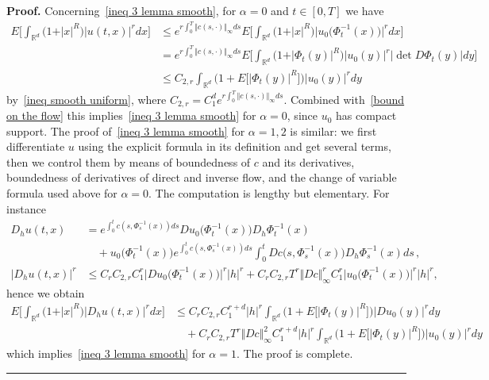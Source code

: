 \documentclass[a4paper,10pt]{article}
\newenvironment{proof}[1][Proof]{\noindent\textbf{#1.} }{\ \rule{0.5em}{0.5em}}
\begin{document}
\begin{proof}
Concerning~\eqref{ineq 3 lemma smooth}, for $\alpha=0$ and $t \in [0,T]$ we have
\begin{align*}
E\Big[  \int_{\mathbb{R}^{d}} \big(1+ \vert x \vert^{R} \big)  \vert u (t,x) \vert^{r} dx \Big]   &  \leq e^{r\int_{0}^{T} \Vert c(s,\cdot) \Vert_{\infty}ds} E\Big[
\int_{\mathbb{R}^{d}} \big(1+ \vert x \vert^{R} \big) \big\vert u_{0} \big( \Phi_{t}^{-1}(x) \big) \big\vert^{r} dx \Big]  \\
&  =e^{r\int_{0}^{T} \Vert c(s,\cdot) \Vert_{\infty}ds} E \Big[ \int_{\mathbb{R}^{d}} \big(1+ \vert \Phi_{t} (y) \vert^{R} \big)  \vert u_{0}(y) \vert^{r} \vert \det D\Phi_{t}(y) \vert dy \Big]  \\
&  \leq C_{2,r}\int_{\mathbb{R}^{d}} \big(1+ E\big[ \vert \Phi_{t}(y) \vert^{R}\big]  \big) \vert u_{0}(y) \vert^{r}dy
\end{align*}
by~\eqref{ineq smooth uniform}, where $C_{2,r}=C_{1}^d e^{r\int_{0}^{T} \Vert c(s,\cdot)  \Vert_{\infty} ds}$. Combined with~\eqref{bound on the flow} 
this implies~\eqref{ineq 3 lemma smooth} for $\alpha=0$, since $u_{0}$ has compact support.
The proof of~\eqref{ineq 3 lemma smooth} for $\alpha=1,2$ is similar: 
we first differentiate $u$ using the explicit formula in its definition and 
get several terms, then we control them
by means of boundedness of $c$ and its derivatives, boundedness of derivatives
of direct and inverse flow, and the change of variable formula
used above for $\alpha=0$. The computation is lengthy but elementary. For
instance
\begin{align*}
D_{h}u (t,x)   &  =e^{\int_{0}^{t}c(s,\Phi_{s}^{-1}(x) ) ds} Du_{0}\big(\Phi_{t}^{-1}(x)  \big)D_{h}\Phi_{t}^{-1}(x)  \\
&  \quad{} + u_{0}\big(\Phi_{t}^{-1}(x) \big)  e^{\int_{0}^{t}c(s,\Phi_{s}^{-1}(x))ds} \int_{0}^{t} Dc\big(s,\Phi_{s}^{-1}(x) \big)  D_{h}\Phi_{s}^{-1}(x)  ds \, , \\
\vert D_{h} u(t,x)\vert^{r} & \leq C_{r}C_{2,r} C_{1}^{r} \big\vert Du_{0}\big(\Phi_{t}^{-1}(x)  \big) \big\vert^{r} \vert h\vert^{r} + C_{r}C_{2,r} T^{r} \Vert Dc \Vert_{\infty}^{r} C_{1}^{r} \big\vert u_{0}\big(\Phi_{t}^{-1}(x) \big) \big\vert^{r} \vert h\vert^{r},
\end{align*}
hence we obtain
\begin{align*}
E\Big[ \int_{\mathbb{R}^{d}} \big(1+\vert x\vert^{R} \big) \vert D_{h}u(t,x)\vert^{r} dx\Big]   &  \leq C_{r} C_{2,r}C_{1}^{r+d} \vert h\vert^{r} \int_{\mathbb{R}^{d}} \big(1+E\big[
\vert \Phi_{t}(y)\vert^{R} \big] \big) \vert Du_{0}(y) \vert^{r} dy\\
& \quad{} +C_{r}C_{2,r}T^{r} \Vert Dc\Vert_{\infty}^{2} C_{1}^{r+d} \vert h\vert^{r} \int_{\mathbb{R}^{d}} \big(1+E\big[ \vert \Phi_{t}(y) \vert^{R}\big] \big) \vert
u_{0}(y) \vert^{r}dy
\end{align*}
which implies~\eqref{ineq 3 lemma smooth} for $\alpha=1$. The proof is complete.
\end{proof}
\end{document}
